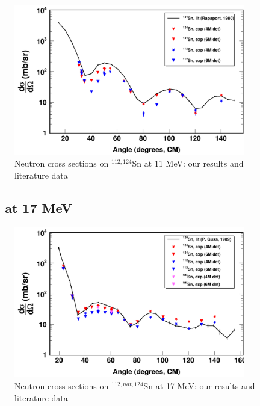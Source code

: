 \begin{figure}
    \begin{center}
        \includegraphics[width = 0.9\textwidth]{figures/neutronECS_Sn_11MeV.png}
        \caption{Neutron \el cross sections on $^{112,124}$Sn at 11
    MeV: our results and literature data}
    \label{SnECS_11MeV}
\end{center}
\end{figure}

\subsection{\snTwelveFour\ \el\ at 17 MeV}

\begin{figure}
    \begin{center}
        \includegraphics[width = 0.9\textwidth]{figures/neutronECS_Sn_17MeV.png}
        \caption{Neutron \el cross sections on $^{112,nat,124}$Sn at 17
    MeV: our results and literature data} \label{SnECS_17MeV}
\end{center}
\end{figure}

\afterpage{\clearpage}
